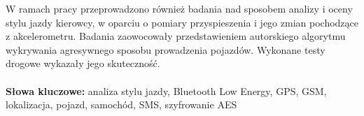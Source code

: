 \begin{singlespacing}
W ramach pracy przeprowadzono również badania nad sposobem analizy i oceny stylu jazdy kierowcy, w oparciu o pomiary przyspieszenia i jego zmian pochodzące z akcelerometru. Badania zaowocowały przedstawieniem autorskiego algorytmu wykrywania agresywnego sposobu prowadzenia pojazdów. Wykonane  testy drogowe wykazały jego skuteczność. \\

\textbf{\\Słowa kluczowe: }analiza stylu jazdy, Bluetooth Low Energy, GPS, GSM, lokalizacja, pojazd, samochód, SMS, szyfrowanie AES

\end{singlespacing}

\cleardoublepage
\thispagestyle{empty}

\\


\\

